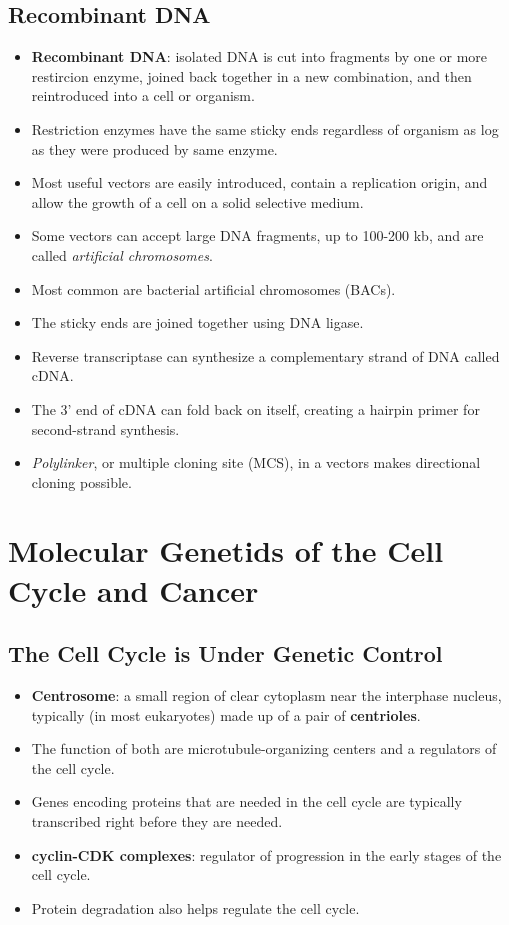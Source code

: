 \documentclass[12pt,a4paper]{article}
\begin{document}
\subsection{Recombinant DNA}
\begin{itemize}
    \item \textbf{Recombinant DNA}: isolated DNA is cut into fragments by one or more restircion enzyme, joined back together in a new combination, and then reintroduced into a cell or organism.
    \item Restriction enzymes have the same sticky ends regardless of organism as log as they were produced by same enzyme.
    \item Most useful vectors are easily introduced, contain a replication origin, and allow the growth of a cell on a solid selective medium.
    \item Some vectors can accept large DNA fragments, up to 100-200 kb, and are called \textit{artificial chromosomes}. 
    \item Most common are bacterial artificial chromosomes (BACs).
    \item The sticky ends are joined together using DNA ligase.
    \item Reverse transcriptase can synthesize a complementary strand of DNA called cDNA.
    \item The 3' end of cDNA can fold back on itself, creating a hairpin primer for second-strand synthesis.
    \item \textit{Polylinker}, or multiple cloning site (MCS), in a vectors makes directional cloning possible. 
\end{itemize}


\setcounter{section}{12}
\clearpage
\section{Molecular Genetids of the Cell Cycle and Cancer}
\subsection{The Cell Cycle is Under Genetic Control}
\begin{itemize}
    \item \textbf{Centrosome}: a small region of clear cytoplasm near the interphase nucleus, typically (in most eukaryotes) made up of a pair of \textbf{centrioles}. 
    \item The function of both are microtubule-organizing centers and a regulators of the cell cycle.
    \item Genes encoding proteins that are needed in the cell cycle are typically transcribed right before they are needed.
    \item \textbf{cyclin-CDK complexes}: regulator of progression in the early stages of the cell cycle.
    \item Protein degradation also helps regulate the cell cycle.
\end{itemize}
\end{document}
